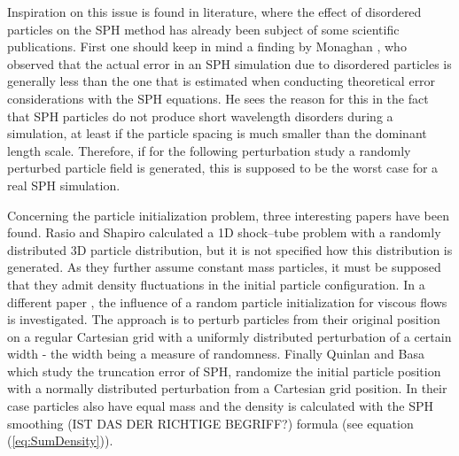 \documentclass{report}
\begin{document}
 Inspiration on this issue is found in literature, where the effect of disordered particles on the SPH method has already been subject of some scientific publications.                                                                                                                      
 First one should keep in mind a finding by Monaghan \cite{Monaghan2005}, who observed that the actual error in an SPH simulation due to disordered particles is generally less than the one that is estimated when conducting theoretical error considerations with the SPH equations. He sees the reason for this in the fact that SPH particles do not produce short wavelength disorders during a simulation, at least if the particle spacing is much smaller than the dominant length scale. Therefore, if for the following perturbation study a randomly perturbed particle field is generated, this is supposed to be the worst case for a real SPH simulation.                                                                  
                                                                                                                                              
 Concerning the particle initialization problem, three interesting papers have been found. Rasio and Shapiro \cite{Rasio1991} calculated a 1D shock--tube problem with a randomly distributed 3D particle distribution, but it is not specified how this distribution is generated. As they further assume constant mass particles, it must be supposed that they admit density fluctuations in the initial particle configuration.          
 In a different paper \cite{Graham2007}, the influence of a random particle initialization for viscous flows is investigated. The approach is to perturb particles from their original position on a regular Cartesian grid with a uniformly distributed perturbation of a certain width - the width being a measure of randomness.                                                                                                         
 Finally Quinlan and Basa \cite{Quinlan2006} which study the truncation error of SPH, randomize the initial particle position with a normally distributed perturbation from a Cartesian grid position. In their case particles also have equal mass and the density is calculated with the SPH smoothing (IST DAS DER RICHTIGE BEGRIFF?) formula (see equation (\ref{eq:SumDensity})).                                                     
                                                                                                                                              
\end{document}

